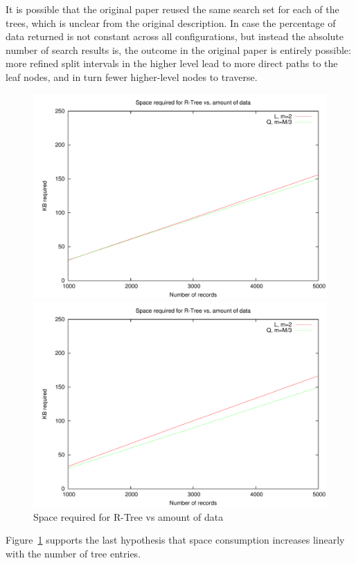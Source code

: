 It is possible that the original paper reused the same search set for each of the trees, which is unclear from the original description. In case the percentage of data returned is not constant across all configurations, but instead the absolute number of search results is, the outcome in the original paper is entirely possible: more refined split intervals in the higher level lead to more direct paths to the leaf nodes, and in turn fewer higher-level nodes to traverse.  

\begin{figure}
\centering
\begin{minipage}{0.49\textwidth}
\centering
\includegraphics[width=\textwidth]{fig/random/figure-4-10.pdf}
\end{minipage}
\begin{minipage}{0.49\textwidth}
\centering
\includegraphics[width=\textwidth]{fig/usppp/figure-4-10.pdf}
\end{minipage}
\caption{Space required for R-Tree vs amount of data}
\label{fig:4.10}
\end{figure}

Figure~\ref{fig:4.10} supports the last hypothesis that space consumption increases linearly with the number of tree entries. 

